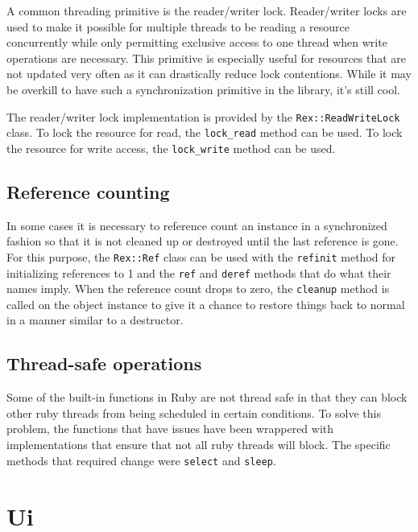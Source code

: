 \documentclass{report}
\begin{document}
\par
A common threading primitive is the reader/writer lock.
Reader/writer locks are used to make it possible for multiple
threads to be reading a resource concurrently while only permitting
exclusive access to one thread when write operations are necessary.
This primitive is especially useful for resources that are not
updated very often as it can drastically reduce lock contentions.
While it may be overkill to have such a synchronization primitive in
the library, it's still cool.

\par
The reader/writer lock implementation is provided by the
\texttt{Rex::ReadWriteLock} class.  To lock the resource for read,
the \texttt{lock\_read} method can be used.  To lock the resource
for write access, the \texttt{lock\_write} method can be used.

        \subsection{Reference counting}

\par
In some cases it is necessary to reference count an instance in a
synchronized fashion so that it is not cleaned up or destroyed until
the last reference is gone.  For this purpose, the \texttt{Rex::Ref}
class can be used with the \texttt{refinit} method for initializing
references to 1 and the \texttt{ref} and \texttt{deref} methods that
do what their names imply.  When the reference count drops to zero,
the \texttt{cleanup} method is called on the object instance to give
it a chance to restore things back to normal in a manner similar to
a destructor.

        \subsection{Thread-safe operations}

\par
Some of the built-in functions in Ruby are not thread safe in that
they can block other ruby threads from being scheduled in certain
conditions.  To solve this problem, the functions that have issues
have been wrappered with implementations that ensure that not all
ruby threads will block.  The specific methods that required change
were \texttt{select} and \texttt{sleep}.

    \section{Ui}
\end{document}
